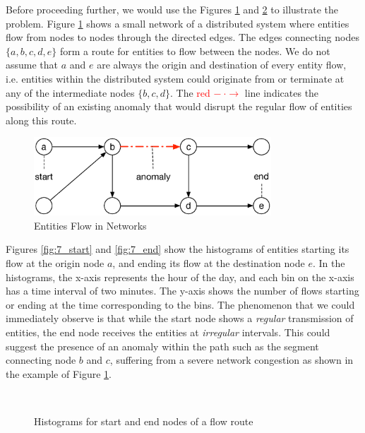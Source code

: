 \documentclass[conference]{IEEEtran.1.8}
\begin{document}
Before proceeding further, we would use the Figures \ref{fig:travel_graph} and \ref{fig:7} to illustrate the problem. Figure \ref{fig:travel_graph} shows a small network of a distributed system where entities flow from nodes to nodes through the directed edges. The edges connecting nodes $\{a, b, c, d, e\}$ form a route for entities to flow between the nodes. We do not assume that $a$ and $e$ are always the origin and destination of every entity flow, i.e. entities within the distributed system could originate from or terminate at any of the intermediate nodes $\{b, c, d\}$. The \textcolor{red}{red $- ~ \cdot \rightarrow$} line indicates the possibility of an existing anomaly that would disrupt the regular flow of entities along this route.
\begin{figure}[htb]
	\centering
	\includegraphics[width=3.5in]{travel_graph}
	\caption{Entities Flow in Networks}
	\label{fig:travel_graph}
\end{figure}

Figures \ref{fig:7_start} and \ref{fig:7_end} show the histograms of entities starting its flow at the origin node $a$, and ending its flow at the destination node $e$. In the histograms, the x-axis represents the hour of the day, and each bin on the x-axis has a time interval of two minutes. The y-axis shows the number of flows starting or ending at the time corresponding to the bins. The phenomenon that we could immediately observe is that while the start node shows a \emph{regular} transmission of entities, the end node receives the entities at \emph{irregular} intervals. This could suggest the presence of an anomaly within the path such as the segment connecting node $b$ and $c$, suffering from a severe network congestion as shown in the example of Figure \ref{fig:travel_graph}.
\begin{figure}[htb]
	\centering
	\\
	\caption{Histograms for start and end nodes of a flow route}
	\label{fig:7}
\end{figure}
\end{document}
